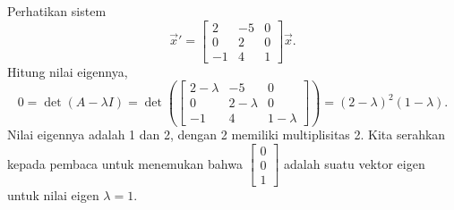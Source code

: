 \begin{example}
Perhatikan sistem
\begin{equation*}
\vec{x}' =
\begin{bmatrix}
2 & -5 & 0 \\
0 & 2 & 0 \\
-1 & 4 & 1
\end{bmatrix}
\vec{x} .
\end{equation*}
Hitung nilai eigennya,
\begin{equation*}
0 =
\det(A-\lambda I) = 
\det\left(
\begin{bmatrix}
2-\lambda & -5 & 0 \\
0 & 2-\lambda & 0 \\
-1 & 4 & 1-\lambda
\end{bmatrix}
\right)
= (2-\lambda)^2(1-\lambda) .
\end{equation*}
Nilai eigennya adalah 1 dan 2, dengan 2 memiliki multiplisitas 2.
Kita serahkan kepada pembaca untuk menemukan bahwa
$\left[ \begin{smallmatrix} 0 \\ 0 \\ 1 \end{smallmatrix} \right]$
adalah suatu vektor eigen
untuk nilai eigen $\lambda = 1$.


\end{example}
